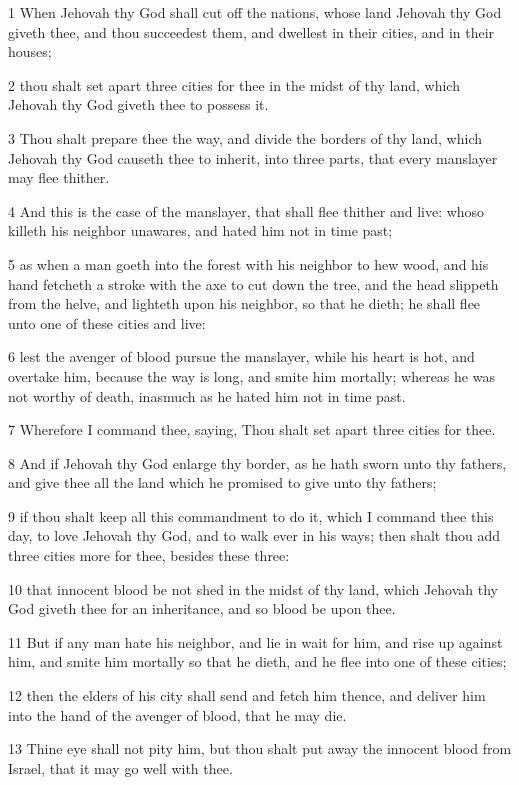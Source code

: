 \par 1 When Jehovah thy God shall cut off the nations, whose land Jehovah thy God giveth thee, and thou succeedest them, and dwellest in their cities, and in their houses;
\par 2 thou shalt set apart three cities for thee in the midst of thy land, which Jehovah thy God giveth thee to possess it.
\par 3 Thou shalt prepare thee the way, and divide the borders of thy land, which Jehovah thy God causeth thee to inherit, into three parts, that every manslayer may flee thither.
\par 4 And this is the case of the manslayer, that shall flee thither and live: whoso killeth his neighbor unawares, and hated him not in time past;
\par 5 as when a man goeth into the forest with his neighbor to hew wood, and his hand fetcheth a stroke with the axe to cut down the tree, and the head slippeth from the helve, and lighteth upon his neighbor, so that he dieth; he shall flee unto one of these cities and live:
\par 6 lest the avenger of blood pursue the manslayer, while his heart is hot, and overtake him, because the way is long, and smite him mortally; whereas he was not worthy of death, inasmuch as he hated him not in time past.
\par 7 Wherefore I command thee, saying, Thou shalt set apart three cities for thee.
\par 8 And if Jehovah thy God enlarge thy border, as he hath sworn unto thy fathers, and give thee all the land which he promised to give unto thy fathers;
\par 9 if thou shalt keep all this commandment to do it, which I command thee this day, to love Jehovah thy God, and to walk ever in his ways; then shalt thou add three cities more for thee, besides these three:
\par 10 that innocent blood be not shed in the midst of thy land, which Jehovah thy God giveth thee for an inheritance, and so blood be upon thee.
\par 11 But if any man hate his neighbor, and lie in wait for him, and rise up against him, and smite him mortally so that he dieth, and he flee into one of these cities;
\par 12 then the elders of his city shall send and fetch him thence, and deliver him into the hand of the avenger of blood, that he may die.
\par 13 Thine eye shall not pity him, but thou shalt put away the innocent blood from Israel, that it may go well with thee.
